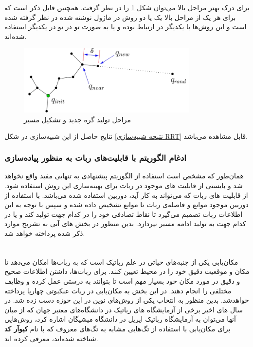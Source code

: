 \newpage
برای درک بهتر مراحل بالا می‌توان شکل
\ref{مراحل تولید گره جدید}
را در نظر گرفت. همچنین قابل ذکر است که برای هر یک از مراحل بالا یک یا دو روش
\noindent\unskip{}
در ماژول نوشته شده در نظر گرفته شده است و این روش‌ها با یکدیگر در ارتباط بوده و یا به صورت تو در تو
\noindent\unskip{}
در یکدیگر استفاده شده‌اند. 
\begin{figure}[H]
	\centering
	\includegraphics[width=0.8\textwidth]{./images/Chapter2/NewNodeSteps_without_background}	
	\caption[مراحل تولید گره جدید و تشکیل مسیر]{مراحل تولید گره جدید و تشکیل مسیر\cite{Algobotics}}
	\label{مراحل تولید گره جدید}
\end{figure}
\noindent
\unskip
نتایج حاصل از این شبیه‌سازی در شکل
\ref{نتیجه شبیه‌سازی RRT}
قابل مشاهده می‌باشد.
\subsubsection{ادغام الگوریتم با قابلیت‌های ربات به منظور پیاده‌سازی}
همان‌طور که مشخص است استفاده از الگوریتم پیشنهادی به تنهایی مفید واقع نخواهد شد و بایستی از قابلیت های موجود در ربات برای بهینه‌سازی این روش استفاده شود. از قابلیت های ربات که می‌تواند به کار آید، دوربین استفاده شده می‌باشد. با استفاده از دوربین موجود موانع و فاصله‌ی ربات تا موانع تشخیص داده شده و سپس با توجه به این اطلاعات ربات تصمیم می‌گیرد تا نقاط تصادفی خود را در کدام جهت تولید کند و یا در کدام جهت به تولید ادامه مسیر نپردازد. بدین منظور در بخش های آتی به تشریح موارد ذکر شده پرداخته خواهد شد.

\section{}

مکان‌یابی یکی از جنبه‌های حیاتی در علم رباتیک است که به ربات‌ها امکان می‌دهد تا مکان و موقعیت دقیق خود را در محیط تعیین کنند. برای ربات‌ها، داشتن اطلاعات صحیح و دقیق در مورد مکان خود بسیار مهم است تا بتوانند به درستی عمل کرده و وظایف مختلفی را انجام دهند. در این بخش به مکان‌یابی در ربات عنکبوتی چهارپا پرداخته خواهد‌شد. بدین منظور به انتخاب یکی از روش‌‌‌های نوین در این حوزه دست زده شد. در سال های اخیر برخی از آزمایشگاه های رباتیک در دانشگاه‌‌‌های معتبر جهان که از میان آنها می‌توان به آزمایشگاه رباتیک اپریل
\noindent\unskip{}
در دانشگاه میشیگان اشاره کرد، روش‌هایی برای مکان‌یابی با استفاده از تگ‌هایی مشابه به تگ‌های معروف که با نام 
\textbf{کیوآر کد}
\noindent\unskip{}
شناخته شده‌اند، معرفی کرده اند.

